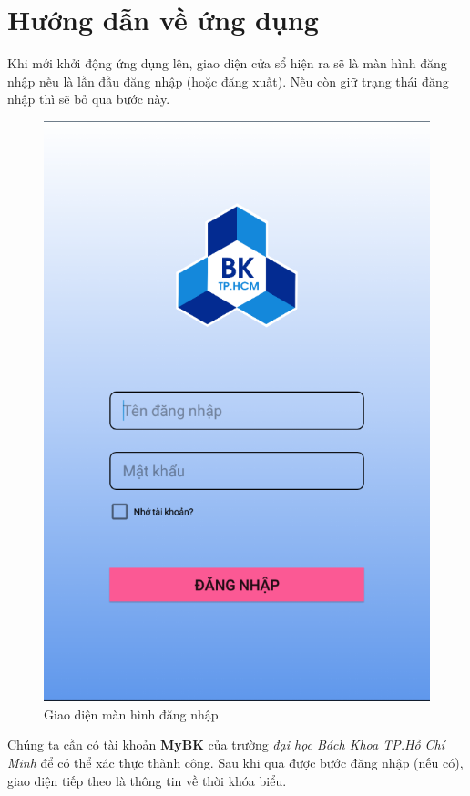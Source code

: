 \documentclass[a4paper]{article}
\begin{document}
\section{Hướng dẫn về ứng dụng}
Khi mới khởi động ứng dụng lên, giao diện cửa sổ hiện ra  sẽ là màn hình đăng nhập nếu là lần đầu đăng nhập (hoặc đăng xuất). Nếu còn giữ trạng thái đăng nhập thì sẽ bỏ qua bước này.
\begin{figure}[H]
    \centering
    \includegraphics[scale=.3]{login.png}
    \caption{Giao diện màn hình đăng nhập}
\end{figure}
Chúng ta cần có tài khoản \textbf{MyBK} của trường \textit{đại học Bách Khoa TP.Hồ Chí Minh} để có thể xác thực thành công. Sau khi qua được bước đăng nhập (nếu có), giao diện tiếp theo là thông tin về thời khóa biểu.
\end{document}
